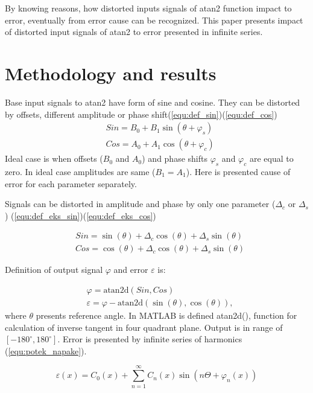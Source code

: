 \documentclass[a4paper]{article}
\begin{document}
By knowing reasons, how distorted inputs signals of atan2 function impact to error, eventually from error cause can be recognized. This paper presents impact of distorted input signals of atan2 to error presented in infinite series.
\section{Methodology and results}

Base input signals to atan2 have form of sine and cosine. They can be distorted by offsets, different amplitude or phase shift(\ref{equ:def_sin})(\ref{equ:def_cos})
\begin{eqnarray}
\label{equ:def_sin}
&Sin = B_{0} + B_1 \sin(\theta + \varphi_{s})\\
\label{equ:def_cos}
&Cos = A_{0} + A_1 \cos(\theta + \varphi_{c})
\end{eqnarray}
Ideal case is when offsets ($B_0$ and $A_0$) and phase shifts $\varphi_s$ and $\varphi_c$  are equal to zero. In ideal case amplitudes are same ($B_1 = A_1$). Here is presented cause of error for each parameter separately.

Signals can be distorted in amplitude and phase by only one parameter ($\Delta_c$ or $\Delta_s$) (\ref{equ:def_eks_sin})(\ref{equ:def_eks_cos})

\begin{eqnarray}
\label{equ:def_eks_sin}
&Sin = \sin(\theta)+\Delta_c \cos(\theta)+\Delta_s \sin(\theta)\\
\label{equ:def_eks_cos}
&Cos =\cos(\theta)+\Delta_c \cos(\theta)+\Delta_s \sin(\theta)
\end{eqnarray}

Definition of output signal $\varphi$ and error $\varepsilon$ is:

\begin{eqnarray}
\label{equ:def_kot}
&\varphi = \mathrm{atan2d}(Sin,Cos)\\
\label{equ:def_err}
&\varepsilon =\varphi - \mathrm{atan2d}(\sin(\theta),\cos(\theta)),
\end{eqnarray}
where $\theta$ presents reference angle. In MATLAB is defined atan2d(), function for calculation of inverse tangent in four quadrant plane. Output is in range of $[-180^\circ,180^\circ]$\cite{atand}. Error is presented by infinite series of harmonics (\ref{equ:potek_napake}).

\begin{equation}
\label{equ:potek_napake}
\varepsilon(x) = C_0(x) + \sum_{n=1}^{\infty} C_n(x) \sin(n \Theta+ \varphi_n(x))
\end{equation}
\end{document}
